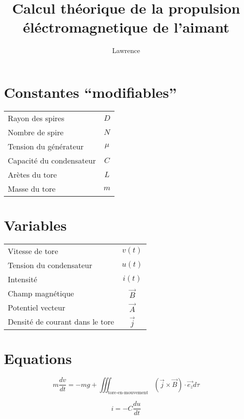 \documentclass[paper=a4]{scrartcl}
\title{Calcul théorique de la propulsion éléctromagnetique de l'aimant}
\author{Lawrence}
\begin{document}
\maketitle

\section*{Constantes ``modifiables''}
\begin{table}[h]
	\begin{tabular}{lc}
		\toprule
		Rayon des spires & \(D\)\\
		Nombre de spire & \(N\)\\
		Tension du générateur & \(\mu\)\\
		Capacité du condensateur & \(C\)\\
		Arètes du tore & \(L\)\\
		Masse du tore & \(m\)\\
		\bottomrule
	\end{tabular}
\end{table}

\section*{Variables}
\begin{table}[h]
	\begin{tabular}{lc}
		\toprule
		Vitesse de tore & \(v(t)\)\\
		Tension du condensateur & \(u(t)\)\\
		Intensité & \(i(t)\)\\
		Champ magnétique & \(\vec{B}\)\\
		Potentiel vecteur & \(\vec{A}\)\\
		Densité de courant dans le tore & \(\vec{j}\)\\
		\bottomrule
	\end{tabular}
\end{table}

\section*{Equations}
\begin{equation}
	\boxed{
		m \frac{dv}{dt} = -mg + \iiint_{
			\textrm{tore-en-mouvement}} (\vec{j} \times \vec{B}) \cdot \vec{e_z
			}d\tau
	}
	\label{m}
\end{equation}

\begin{equation}
	i = -C \frac{du}{dt}
	\label{i}
\end{equation}
\end{document}
